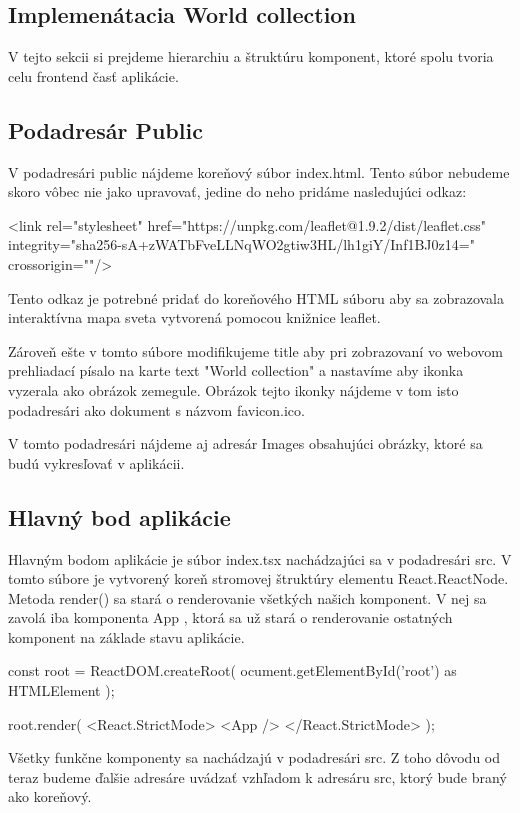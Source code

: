 \subsection{Implemenátacia World collection}
V tejto sekcii si prejdeme hierarchiu a štruktúru komponent, ktoré spolu tvoria celu frontend časť aplikácie. 

\subsection*{Podadresár Public}
V podadresári public nájdeme koreňový súbor index.html. Tento súbor nebudeme skoro vôbec nie jako upravovať, jedine do neho pridáme nasledujúci odkaz: 
\begin{code}
<link rel="stylesheet" href="https://unpkg.com/leaflet@1.9.2/dist/leaflet.css"
integrity="sha256-sA+zWATbFveLLNqWO2gtiw3HL/lh1giY/Inf1BJ0z14="
crossorigin=""/>
\end{code}
Tento odkaz je potrebné pridať do koreňového HTML súboru aby sa zobrazovala interaktívna mapa sveta vytvorená pomocou knižnice leaflet. 

Zároveň ešte v tomto súbore modifikujeme title aby pri zobrazovaní vo webovom prehliadací písalo na karte text "World collection" a nastavíme aby ikonka vyzerala ako obrázok zemegule. 
Obrázok tejto ikonky nájdeme v tom isto podadresári ako dokument s názvom favicon.ico. 

V tomto podadresári nájdeme aj adresár Images obsahujúci obrázky, ktoré sa budú vykresľovať v aplikácii. 

\subsection*{Hlavný bod aplikácie}
Hlavným bodom aplikácie je súbor index.tsx nachádzajúci sa v podadresári src. V tomto súbore je vytvorený koreň stromovej štruktúry elementu React.ReactNode. 
Metoda render() sa stará o renderovanie všetkých našich komponent. V nej sa zavolá iba komponenta App , ktorá sa už stará o renderovanie ostatných komponent na základe stavu aplikácie. 

\begin{code}
const root = ReactDOM.createRoot(
      ocument.getElementById('root') as HTMLElement
);

root.render(
      <React.StrictMode>
            <App />
      </React.StrictMode>
      );
\end{code}

Všetky funkčne komponenty sa nachádzajú v podadresári src. Z toho dôvodu od teraz budeme ďalšie adresáre uvádzať vzhľadom k adresáru src, ktorý bude braný ako koreňový. 

